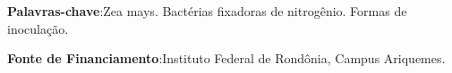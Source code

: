 \documentclass[article,12pt,onesidea,4paper,english,brazil]{abntex2}
\begin{document}
	\vspace{\onelineskip}
	
	\noindent
	\textbf{Palavras-chave}:Zea mays. Bactérias fixadoras de nitrogênio. Formas de
	inoculação.
	
    \noindent 
    \textbf{Fonte de Financiamento}:Instituto Federal de Rondônia, Campus Ariquemes.
	
	
\end{document}
